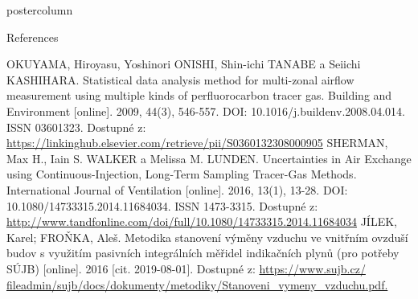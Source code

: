\documentclass{beamer}
\begin{document}
\begin{frame}
\begin{columns}
\begin{column}{.57\textwidth}
\begin{beamercolorbox}[center]{postercolumn}
\begin{minipage}{.98\textwidth}
{					\begin{myblock}{References}
						\footnotesize
                        \tiny
                        \begin{thebibliography}{Mn99}
                                 OKUYAMA, Hiroyasu, Yoshinori ONISHI, Shin-ichi TANABE a Seiichi KASHIHARA. Statistical data analysis method for multi-zonal airflow measurement using multiple kinds of perfluorocarbon tracer gas. Building and Environment [online]. 2009, 44(3), 546-557. DOI: 10.1016/j.buildenv.2008.04.014. ISSN 03601323. Dostupné z: \url{https://linkinghub.elsevier.com/retrieve/pii/S0360132308000905} 
                                 SHERMAN, Max H., Iain S. WALKER a Melissa M. LUNDEN. Uncertainties in Air Exchange using Continuous-Injection, Long-Term Sampling Tracer-Gas Methods. International Journal of Ventilation [online]. 2016, 13(1), 13-28. DOI: 10.1080/14733315.2014.11684034. ISSN 1473-3315. Dostupné z: \url{http://www.tandfonline.com/doi/full/10.1080/14733315.2014.11684034}
                                 JÍLEK, Karel; FROŇKA, Aleš. Metodika stanovení výměny vzduchu ve vnitřním ovzduší budov s využitím pasivních integrálních měřidel indikačních plynů (pro potřeby SÚJB) [online]. 2016 [cit. 2019-08-01]. Dostupné z: \url{https://www.sujb.cz/
fileadmin/sujb/docs/dokumenty/metodiky/Stanoveni_vymeny_vzduchu.pdf.}
                        \end{thebibliography}
					\end{myblock}\vfill
		}\end{minipage}\end{beamercolorbox}
	\end{column}
\end{columns}
\end{frame}
\end{document}
